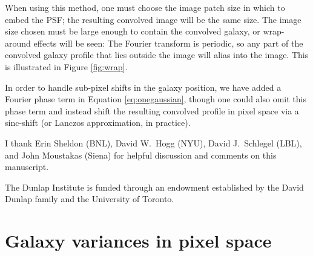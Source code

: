 \documentclass[11pt,preprint]{aastex}
\newcommand{\eqnref}[1]{Equation \ref{#1}}
\newcommand{\trick}{method}
\begin{document}
When using this \trick, one must choose the image patch size in which
to embed the PSF; the resulting convolved image will be the same size.
The image size chosen must be large enough to contain the convolved
galaxy, or wrap-around effects will be seen: The Fourier transform is
periodic, so any part of the convolved galaxy profile that lies
outside the image will alias into the image.  This is
illustrated in Figure \ref{fig:wrap}.

In order to handle sub-pixel shifts in the galaxy position, we have
added a Fourier phase term in \eqnref{eq:onegaussian}, though one
could also omit this phase term and instead shift the resulting
convolved profile in pixel space via a sinc-shift (or Lanczos
approximation, in practice).




\acknowledgements

I thank Erin Sheldon (BNL),
David W.~Hogg (NYU), David J.~Schlegel (LBL), and John Moustakas (Siena)
for helpful discussion and comments on this manuscript.

The Dunlap Institute is funded through an endowment established by the
David Dunlap family and the University of Toronto.




\appendix

\section{Galaxy variances in pixel space}
\label{app:transform}
\end{document}

